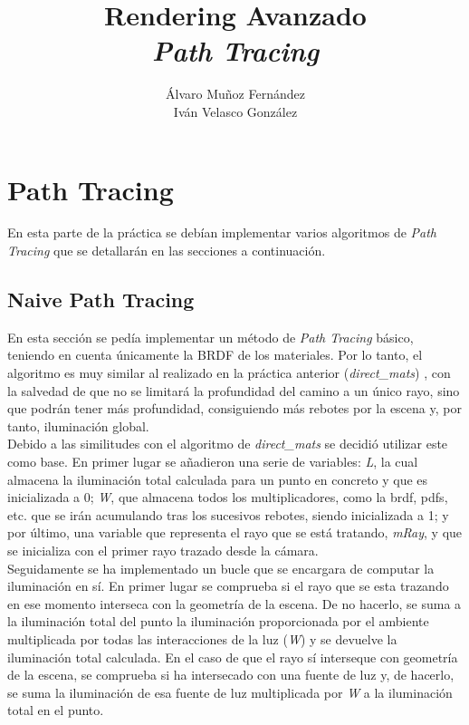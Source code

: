 \documentclass[10pt,oneside,a4paper]{article}
\begin{document}
\begin{titlepage}

\title{\Huge Rendering Avanzado  \\[0.7in] \LARGE \textit{Path Tracing}\\[3.6in]}
\date{}
\author{Álvaro Muñoz Fernández\\
Iván Velasco González}
\maketitle
\thispagestyle{empty}
\end{titlepage}

\section{Path Tracing}
En esta parte de la práctica se debían implementar varios algoritmos de \textit{Path Tracing} que se detallarán en las secciones a continuación.
\subsection{Naive Path Tracing}
En esta sección se pedía implementar un método de \textit{Path Tracing} básico, teniendo en cuenta únicamente la BRDF de los materiales. Por lo tanto, el algoritmo es muy similar al realizado en la práctica anterior (\textit{direct\_mats}) , con la salvedad de que no se limitará la profundidad del camino a un único rayo, sino que podrán tener más profundidad, consiguiendo más rebotes por la escena y, por tanto, iluminación global.\\

Debido a las similitudes con el algoritmo de \textit{direct\_mats} se decidió utilizar este como base. En primer lugar se añadieron una serie de variables: \textit{L}, la cual almacena la iluminación total calculada para un punto en concreto y que es inicializada a 0; \textit{W}, que almacena todos los multiplicadores, como la brdf, pdfs, etc. que se irán acumulando tras los sucesivos rebotes, siendo inicializada a 1; y por último, una variable que representa el rayo que se está tratando, \textit{mRay}, y que se inicializa con el primer rayo trazado desde la cámara.\\

Seguidamente se ha implementado un bucle que se encargara de computar la iluminación en sí. En primer lugar se comprueba si el rayo que se esta trazando en ese momento interseca con la geometría de la escena. De no hacerlo, se suma a la iluminación total del punto la iluminación proporcionada por el ambiente multiplicada por todas las interacciones de la luz (\textit{W}) y se devuelve la iluminación total calculada. En el caso de que el rayo sí interseque con geometría de la escena, se comprueba si ha intersecado con una fuente de luz y, de hacerlo, se suma la iluminación de esa fuente de luz multiplicada por \textit{W} a la iluminación total en el punto.\\
\end{document}
